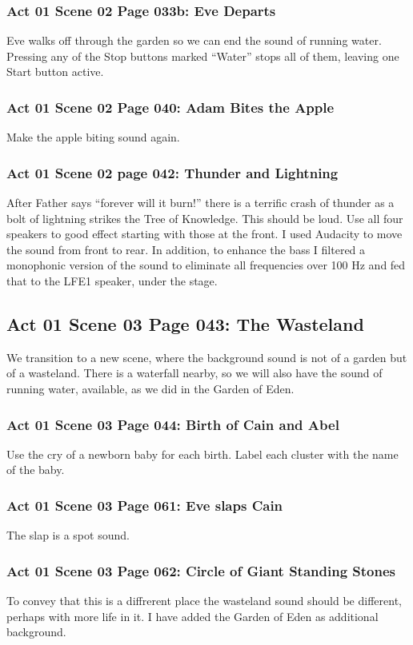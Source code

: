 \documentclass[letterpaper,twoside]{article}
\begin{document}
\subsubsection{Act 01 Scene 02 Page 033b: Eve Departs}
Eve walks off through the garden so
we can end the sound of running water.  Pressing any of the Stop
buttons marked ``Water'' stops all of them, leaving one Start button
active.

\subsubsection{Act 01 Scene 02 Page 040: Adam Bites the Apple}
Make the apple biting sound again.

\subsubsection{Act 01 Scene 02 page 042: Thunder and Lightning}
After Father says ``forever will it burn!'' there is a terrific
crash of thunder as a bolt of lightning strikes the Tree of Knowledge.
This should be loud.  Use all four speakers to good effect
starting with those at the front.  I used Audacity to move the sound
from front to rear.  In addition, to enhance the bass
I filtered a monophonic version of
the sound to eliminate all frequencies over 100 Hz and fed that
to the LFE1 speaker, under the stage.

\subsection{Act 01 Scene 03 Page 043: The Wasteland}
We transition to a new scene, where the background sound
is not of a garden but of a wasteland.  There is a waterfall
nearby, so we will also have the sound of running water, available,
as we did in the Garden of Eden.

\subsubsection{Act 01 Scene 03 Page 044: Birth of Cain and Abel}
Use the cry of a newborn baby for each birth.  Label each cluster
with the name of the baby.

\subsubsection{Act 01 Scene 03 Page 061: Eve slaps Cain}
The slap is a spot sound.

\subsubsection{Act 01 Scene 03 Page 062: Circle of Giant Standing Stones}
To convey that this is a diffrerent place the wasteland sound
should be different, perhaps with more life in it.  I have added
the Garden of Eden as additional background.
\end{document}
